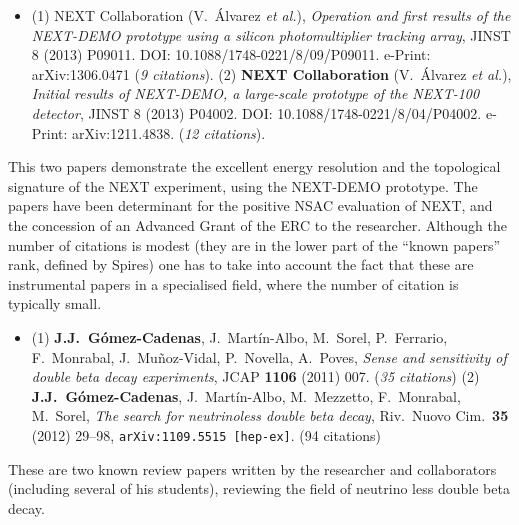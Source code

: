 \begin{itemize}
\item (1) {NEXT Collaboration} (V.~\'Alvarez {\it et al.}), \textit{	
Operation and first results of the NEXT-DEMO prototype using a silicon photomultiplier tracking array}, 
JINST 8 (2013) P09011. DOI: 10.1088/1748-0221/8/09/P09011. 
e-Print: arXiv:1306.0471 ({\it 9 citations}).
(2) {\bf NEXT Collaboration} (V.~\'Alvarez {\it et al.}), \textit{Initial results of NEXT-DEMO, a large-scale prototype of the NEXT-100 detector},  JINST 8 (2013) P04002. 
DOI: 10.1088/1748-0221/8/04/P04002. 
e-Print: arXiv:1211.4838.  ({\it 12 citations}).
\end{itemize}
This two papers demonstrate the excellent energy resolution and the topological signature of the NEXT experiment, using the  NEXT-DEMO prototype. The papers have been determinant for the positive NSAC evaluation of NEXT, and the concession of an Advanced Grant of the ERC to the researcher. Although the number of citations is modest (they are in the lower part of the ``known papers'' rank, defined by Spires) one has to take into account  the fact that these are instrumental  papers in a specialised field, where the number of citation is typically small. 

\begin{itemize}
\item (1) {\bf J.J.~G\'omez-Cadenas}, J.~Mart\'in-Albo, M.~Sorel, P.~Ferrario, F.~Monrabal, J.~Mu\~noz-Vidal, P.~Novella, A.~Poves, \textit{Sense and sensitivity of double beta decay experiments}, JCAP {\bf 1106} (2011) 007. ({\it 35 citations})  
(2) {\bf J.J.~G\'omez-Cadenas}, J.~Mart\'in-Albo, M.~Mezzetto, F.~Monrabal, M.~Sorel, {\em The search for neutrinoless double beta decay}, Riv.\ Nuovo Cim.\ {\bf35} (2012) 29--98, {\tt arXiv:1109.5515 [hep-ex]}. (94 citations)
\end{itemize}
These are two known review papers written by the researcher and collaborators (including several of his students), reviewing the field of neutrino less double beta decay.  

